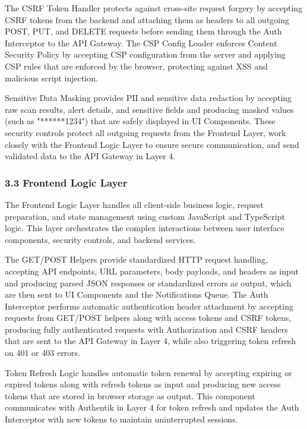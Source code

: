 \documentclass[12pt,a4paper]{report}
\begin{document}
The CSRF Token Handler protects against cross-site request forgery by accepting CSRF tokens from the backend and attaching them as headers to all outgoing POST, PUT, and DELETE requests before sending them through the Auth Interceptor to the API Gateway. The CSP Config Loader enforces Content Security Policy by accepting CSP configuration from the server and applying CSP rules that are enforced by the browser, protecting against XSS and malicious script injection.

Sensitive Data Masking provides PII and sensitive data redaction by accepting raw scan results, alert details, and sensitive fields and producing masked values (such as "******1234") that are safely displayed in UI Components. These security controls protect all outgoing requests from the Frontend Layer, work closely with the Frontend Logic Layer to ensure secure communication, and send validated data to the API Gateway in Layer 4.

\subsubsection{3.3 Frontend Logic Layer}

The Frontend Logic Layer handles all client-side business logic, request preparation, and state management using custom JavaScript and TypeScript logic. This layer orchestrates the complex interactions between user interface components, security controls, and backend services.

The GET/POST Helpers provide standardized HTTP request handling, accepting API endpoints, URL parameters, body payloads, and headers as input and producing parsed JSON responses or standardized errors as output, which are then sent to UI Components and the Notifications Queue. The Auth Interceptor performs automatic authentication header attachment by accepting requests from GET/POST helpers along with access tokens and CSRF tokens, producing fully authenticated requests with Authorization and CSRF headers that are sent to the API Gateway in Layer 4, while also triggering token refresh on 401 or 403 errors.

Token Refresh Logic handles automatic token renewal by accepting expiring or expired tokens along with refresh tokens as input and producing new access tokens that are stored in browser storage as output. This component communicates with Authentik in Layer 4 for token refresh and updates the Auth Interceptor with new tokens to maintain uninterrupted sessions.
\end{document}
